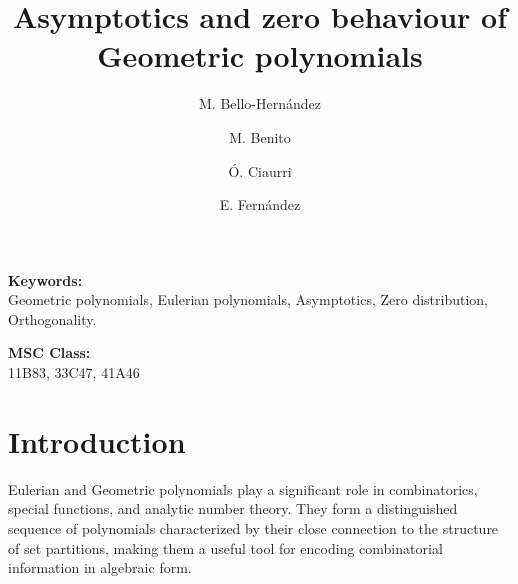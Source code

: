 \documentclass[11pt]{article}
\title{Asymptotics and zero behaviour of Geometric polynomials}
\author{M. Bello-Hernández \and M. Benito \and Ó. Ciaurri \and E. Fernández}
\begin{document}











\maketitle

\date{}

%






\vspace{0.5cm}
\noindent
\textbf{Keywords:}\\
\hspace*{1cm}Geometric polynomials, Eulerian polynomials, Asymptotics, Zero distribution, Orthogonality.

\vspace{0.5cm}
\noindent
\textbf{MSC Class:}\\
\hspace*{1cm}11B83, 33C47, 41A46

\section{Introduction}
Eulerian and Geometric polynomials  play a significant role in combinatorics, special functions, and analytic number theory. They form a distinguished sequence of polynomials characterized by their close connection to the structure of set partitions, making them a useful tool for encoding combinatorial information in algebraic form. 
\end{document}
